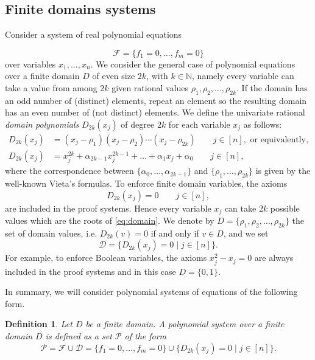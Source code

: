 \documentclass[11pt]{article}
\newcommand{\F}{\mathcal{F}}
\newcommand{\N}{\mathbb{N}}
\newcommand{\1}{\textbf{1}}
\newcommand{\Do}{\mathcal{D}}
\newtheorem{definition}[theorem]{Definition}
\begin{document}
\subsection{Finite domains systems}
Consider a system of real polynomial equations

\begin{equation}\label{eq:Psystem}
\F=\{f_1=0,\ldots,f_m=0\}    
\end{equation}
over variables $x_1,\ldots,x_n$.
We consider the general case of polynomial equations over a finite domain $D$ of even size $2k$, with $k\in \N$, namely every variable can take a value from among $2k$ given rational values $\rho_{1},\rho_{2},\ldots,\rho_{2k}$. If the domain has an odd number of (distinct) elements, repeat an element so the resulting domain has an even number of (not distinct) elements.
We define the univariate rational \emph{domain polynomials} $D_{2k}(x_j)$ of degree $2k$ for each variable $x_j$ as follows: 
\begin{align}
D_{2k}(x_j)&=(x_j-\rho_{1})(x_j-\rho_{2})\cdots (x_j-\rho_{2k}) \qquad j\in[n], \textrm{ or equivalently,}    \label{eq:domain_f_roots}\\
D_{2k}(x_j)&=x_j^{2k}+\alpha_{2k-1}x_j^{2k-1}+\dots + \alpha_1 x_j + \alpha_0 \qquad j\in[n], \label{eq:domain_f}   
\end{align}
where the correspondence between $\{\alpha_0,\ldots,\alpha_{2k-1}\}$ and $\{\rho_1,\ldots,\rho_{2k}\}$ is given by the well-known Vieta's formulas.
To enforce finite domain variables, the axioms
%
\begin{equation}\label{eq:domain}
D_{2k}(x_j)=0 \qquad j\in[n],    
\end{equation}
%
are included in the proof systems. 
%
Hence every variable $x_j$ can take $2k$ possible values which are the roots of \cref{eq:domain}. We denote by $D=\{\rho_1, \rho_2, \dots, \rho_{2k}\}$ the set of domain values, i.e. $D_{2k}(v)=0$ if and only if $v\in D$, and we set
%
\begin{equation}\label{eq:D}
    \Do=\{D_{2k}(x_j)=0\mid j\in[n]\}.
\end{equation}
For example, to enforce Boolean variables, the axioms $x^2_j - x_j=0$ are always included in the proof systems and in this case $D=\{0,1\}$. 

In summary, we will consider polynomial systems of equations of the following form.

\begin{definition}
    Let $D$ be a finite domain. A \emph{polynomial system over a finite domain $D$} is defined as a set $\mathcal{P}$ of the form
    \begin{equation}\label{eq:axiomsF}
        \mathcal{P} = \F \cup \Do =\{f_1=0,\ldots,f_m=0\} \cup \{D_{2k}(x_j)=0\mid j\in[n]\}.
    \end{equation}
\end{definition}
\end{document}
